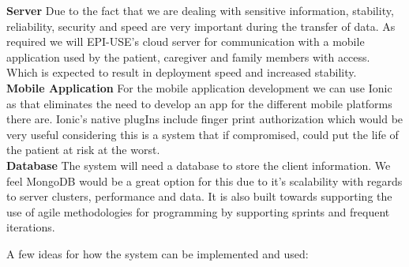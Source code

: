 \documentclass[12pt]{article}
\begin{document}
	\textbf{Server}
	Due to the fact that we are dealing with sensitive information, stability, reliability, security and speed are very important during the transfer of data. As required we will EPI-USE's cloud server for communication with a mobile application used by the patient, caregiver and family members with access. Which is expected to result in deployment speed and increased stability.\\ 
	
	
	\textbf{Mobile Application}
	For the mobile application development we can use Ionic as that eliminates the need to develop an app for the different mobile platforms there are. Ionic's native plugIns include finger print authorization which would be very useful considering this is a system that if compromised, could put the life of the patient at risk at the worst. \\
	
	\textbf{Database}
	The system will need a database to store the client information. We feel MongoDB would be a great option for this due to it's scalability with regards to server clusters, performance and data. It is also built towards supporting the use of agile methodologies for programming by supporting sprints and frequent iterations.
	
	A few ideas for how the system can be implemented and used:
	
\end{document}
